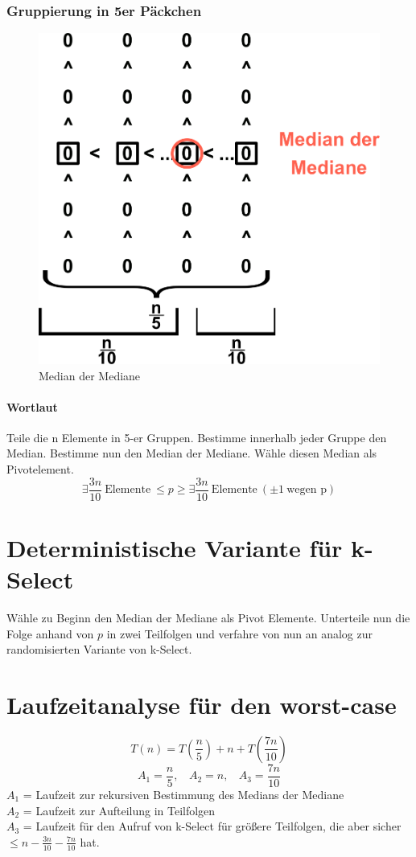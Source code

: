\subsubsection*{Gruppierung in 5er Päckchen}
\begin{figure}
\vspace{-40pt}
\centering
\includegraphics[width=0.6\linewidth]{08/Grafik/img1.png}
\caption{Median der Mediane}
\end{figure}

\vspace{20pt}
\paragraph{Wortlaut}
Teile die n Elemente in 5-er Gruppen. Bestimme innerhalb jeder Gruppe den Median. Bestimme nun den Median der Mediane. Wähle diesen Median als Pivotelement.
\[\exists \frac{3n}{10}~\text{Elemente}~\leq p \geq \exists \frac{3n}{10}~\text{Elemente}~(\pm 1~\text{wegen p})\]
\vspace{1pt}




\section{Deterministische Variante für k-Select}
Wähle zu Beginn den Median der Mediane als Pivot Elemente. Unterteile nun die Folge anhand von $p$ in zwei Teilfolgen und verfahre von nun an analog zur randomisierten Variante von k-Select.

\section{Laufzeitanalyse für den worst-case}
\[T(n) = T\left(\frac{n}{5}\right)+n+T \left(\frac{7n}{10} \right) \]
\[A_1 = \frac{n}{5},~~~~A_2 = n,~~~~A_3= \frac{7n}{10}\]
$A_1$ = Laufzeit zur rekursiven Bestimmung des Medians der Mediane\\
$A_2$ = Laufzeit zur Aufteilung in Teilfolgen\\
$A_3$ = Laufzeit für den Aufruf von k-Select  für größere Teilfolgen, die aber sicher $\leq n - \frac{3n}{10} - \frac{7n}{10}$ hat.\\

